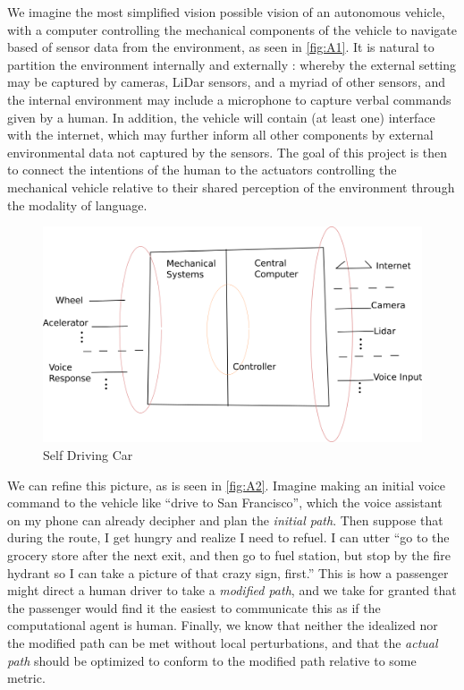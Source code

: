 \documentclass{article}
\begin{document}
We imagine the most simplified vision possible vision of an autonomous vehicle,
with a computer controlling the mechanical components of the vehicle to navigate
based of sensor data from the environment, as seen in \autoref{fig:A1}. It is
natural to partition the environment internally and externally : whereby the
external setting may be captured by cameras, LiDar sensors, and a myriad of
other sensors, and the internal environment may include a microphone to capture
verbal commands given by a human. In addition, the vehicle will contain (at
least one) interface with the internet, which may further inform all other
components by external environmental data not captured by the sensors. The goal
of this project is then to connect the intentions of the human to the actuators
controlling the mechanical vehicle relative to their shared perception of the
environment through the modality of language.

\begin{figure}[H]
\centering
\includegraphics[width=150mm]{pics/selfDriving.png}
\caption{Self Driving Car}\label{fig:A1}
\end{figure}

We can refine this picture, as is seen in \autoref{fig:A2}. Imagine making an
initial voice command to the vehicle like ``drive to San Francisco'', which the
voice assistant on my phone can already decipher and plan the
\emph{initial path}. Then suppose that during the route, I get hungry and
realize I need to refuel. I can utter ``go to the grocery store after the next
exit, and then go to fuel station, but stop by the fire hydrant so I can take a
picture of that crazy sign, first.'' This is how a passenger might direct a
human driver to take a \emph{modified path}, and we take for granted that the
passenger would find it the easiest to communicate this as if the computational
agent is human. Finally, we know that neither the idealized nor the modified
path can be met without local perturbations, and that the \emph{actual path}
should be optimized to conform to the modified path relative to some metric.
\end{document}
